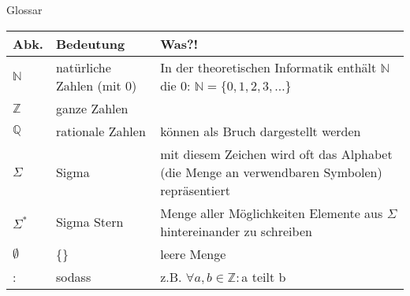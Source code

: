 \begin{frame}[fragile]{Glossar}
	\small
	\begin{tabular}{p{} p{} p{}}
		\toprule
		Abk.&Bedeutung&Was?!\\
		\midrule
		$\mathbb{N}$&natürliche Zahlen (mit 0)&In der theoretischen Informatik enthält $\mathbb{N}$ die 0: $\mathbb{N}=\{0,1,2,3,\dots\}$\\
		$\mathbb{Z}$&ganze Zahlen&\\
		$\mathbb{Q}$&rationale Zahlen&können als Bruch dargestellt werden\\
		$\Sigma$ & Sigma& mit diesem Zeichen wird oft das Alphabet (die Menge an verwendbaren Symbolen) repräsentiert\\
		$\Sigma^\ast$&Sigma Stern&Menge aller Möglichkeiten Elemente aus $\Sigma$ hintereinander zu schreiben\\
		$\emptyset$&\{\}&leere Menge\\
		:&sodass&z.B. $\forall a,b\in\mathbb{Z}:$a teilt b\\
		\bottomrule
	\end{tabular}
\end{frame}